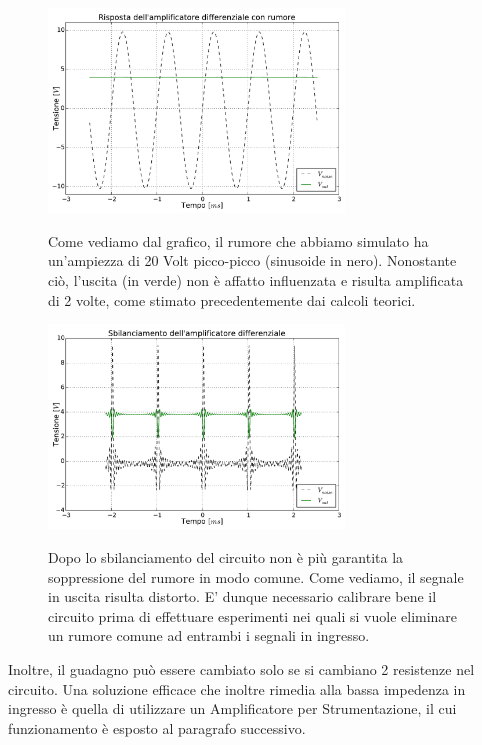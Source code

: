 \begin{figure}[H]
 \centering
   {\includegraphics[width=0.7\textwidth]{../E05/latex/amp_diff.pdf}}
 \caption{Come vediamo dal grafico, il rumore che abbiamo simulato ha un'ampiezza di 20 Volt picco-picco (sinusoide in nero). Nonostante ciò, l'uscita (in verde) non è affatto influenzata e risulta amplificata di 2 volte, come stimato precedentemente dai calcoli teorici. }
 \label{gr5:amp_diff}
\end{figure}

\begin{figure}[H]
 \centering
   {\includegraphics[width=0.7\textwidth]{../E05/latex/sbil_amp_diff.pdf}}
 \caption{Dopo lo sbilanciamento del circuito non è più garantita la soppressione del rumore in modo comune. Come vediamo, il segnale in uscita risulta distorto. E' dunque necessario calibrare bene il circuito prima di effettuare esperimenti nei quali si vuole eliminare un rumore comune ad entrambi i segnali in ingresso.}
 \label{gr5:sbil_amp_diff}
\end{figure}

Inoltre, il guadagno può essere cambiato solo se si cambiano 2 resistenze nel circuito. Una soluzione efficace che inoltre rimedia alla bassa impedenza in ingresso è quella di utilizzare un Amplificatore per Strumentazione, il cui funzionamento è esposto al paragrafo successivo.

